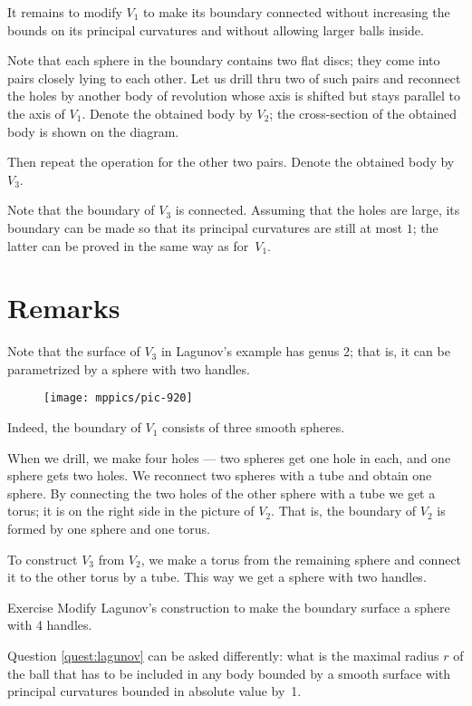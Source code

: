 It remains to modify $V_1$ to make its boundary connected without increasing the bounds on its principal curvatures and without allowing larger balls inside.

Note that each sphere in the boundary contains two flat discs;
they come into pairs closely lying to each other. 
Let us drill thru two of such pairs and reconnect the holes by another body of revolution whose 
axis is shifted but stays parallel to the axis of $V_1$.
Denote the obtained body by $V_2$; the cross-section of the obtained body is shown on the diagram. 

Then repeat the operation for the other two pairs.
Denote the obtained body by $V_3$.

Note that the boundary of $V_3$ is connected.
Assuming that the holes are large, its boundary can be made so that its principal curvatures are still at most $1$; the latter can be proved in the same way as for~$V_1$.
\qeds

\section*{Remarks}

Note that the surface of $V_3$ in Lagunov's example has genus 2;
that is, it can be parametrized by a sphere with two handles.

\begin{figure}[h!]
\centering
\texttt{[image: mppics/pic-920]}
\vskip0mm
\end{figure}

Indeed, the boundary of $V_1$ consists of three smooth spheres.

When we drill, we make four holes --- two spheres get one hole in each, and one sphere gets two holes.
We reconnect two spheres with a tube and obtain one sphere.
By connecting the two holes of the other sphere with a tube we get a torus;
it is on the right side in the picture of $V_2$.
That is, the boundary of $V_2$ is formed by one sphere and one torus.

To construct $V_3$ from $V_2$, we make a torus from the remaining sphere and connect it to the other torus by a tube.
This way we get a sphere with two handles.

\begin{thm}{Exercise}\label{ex:lagunov-genus4}
Modify Lagunov's construction to make the boundary surface a sphere with 4 handles.
\end{thm}

Question \ref{quest:lagunov} can be asked differently: what is the maximal radius $r$ of the ball that has to be included in any body bounded by a smooth surface with principal curvatures bounded in absolute value by~1.

